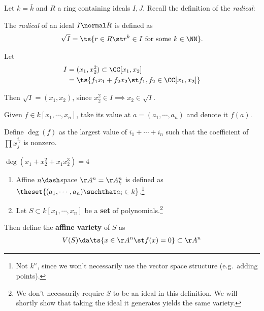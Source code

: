 Let \(k = \bar k\) and \(R\) a ring containing ideals \(I, J\). Recall
the definition of the \emph{radical}:

\begin{definition}[Radical]

The \emph{radical} of an ideal \(I \normal R\) is defined as
\begin{align*}  
\sqrt{I} = \ts{r\in R \st r^k\in I \text{ for some } k\in \NN}
.\end{align*}

\end{definition}

\begin{example}

Let
\begin{align*}
I &= (x_1, x_2^2) \subset \CC[x_1, x_2] \\
  &= \ts{ f_1 x_1 + f_2 x_2 \st f_1, f_2 \in \CC[x_1, x_2]}
\end{align*}

Then \(\sqrt{I} = (x_1, x_2)\), since
\(x_2^2 \in I \implies x_2 \in \sqrt{I}\).

\end{example}

Given \(f\in k[x_1, \cdots, x_n]\), take its value at
\(a = (a_1, \cdots, a_n)\) and denote it \(f(a)\).

\begin{definition}

Define \(\deg(f)\) as the largest value of \(i_1 + \cdots + i_n\) such
that the coefficient of \(\prod x_j ^{i_j}\) is nonzero.

\end{definition}

\begin{example}

\(\deg(x_1 + x_2^2 + x_1 x_2^3) = 4\)

\end{example}

\begin{definition}

\envlist

\begin{enumerate}
\def\labelenumi{\arabic{enumi}.}
\item
  Affine \(n\dash\)space \(\AA^n = \AA_k^n\) is defined as
  \(\theset{(a_1, \cdots, a_n) \suchthat a_i \in k}\).\footnote{Not
    \(k^n\), since we won't necessarily use the vector space structure
    (e.g.~adding points).}
\item
  Let \(S\subset k[x_1, \cdots, x_n]\) be a \textbf{set} of
  polynomials.\footnote{We don't necessarily require \(S\) to be an
    ideal in this definition. We will shortly show that taking the ideal
    it generates yields the same variety.}
\end{enumerate}

Then define the \textbf{affine variety} of \(S\) as
\begin{align*}
  V(S) \da \ts{x\in \AA^n \st f(x) = 0} \subset \AA^n
  \end{align*}

\end{definition}


